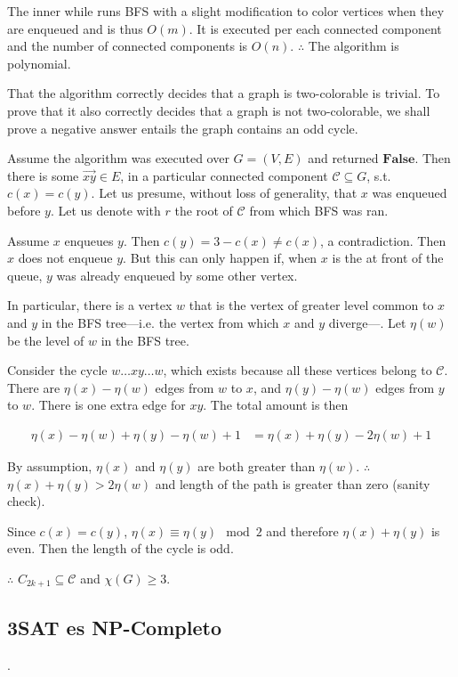 \documentclass[a4paper]{article}
\begin{document}
The inner while runs BFS with a slight modification to color vertices when they
are enqueued and is thus $O(m)$. It is executed per each connected component
and the number of connected components is $O(n)$. $\therefore $ The algorithm 
is polynomial. 

That the algorithm correctly decides that a graph is two-colorable is trivial.
To prove that it also correctly decides that a graph is not two-colorable, we
shall prove a negative answer entails the graph contains an odd cycle.

Assume the algorithm was executed over $G = (V, E)$ and returned
$\textbf{False}$. Then there is some $\overrightarrow{xy} \in E$, in a
particular connected component $\mathcal{C} \subseteq G$, s.t.
$c(x) = c(y)$. Let us presume, without loss of generality, that 
$x$ was enqueued before $y$. Let us denote with $r$ the root 
of $\mathcal{C}$ from which BFS was ran.

Assume $x$ enqueues $y$. Then $c(y) = 3 - c(x) \neq c(x)$, a contradiction.
Then $x$ does not enqueue $y$. But this can only happen if, when $x$ is the at
front of the queue, $y$ was already enqueued by some other vertex. 

In particular, there is a vertex $w$ that is the vertex of greater level common
to $x$ and $y$ in the BFS tree---i.e. the vertex from which $x$ and $y$
diverge---. Let $\eta(w)$ be the level of $w$ in the BFS
tree.

Consider the cycle $w \ldots x y \ldots w$, which exists because all these
vertices belong to $\mathcal{C}$. There are $\eta(x) - \eta(w)$ edges from $w$ to
$x$, and $\eta(y) - \eta(w)$ edges from $y$ to $w$. There is one 
extra edge for $xy$. The total amount is then 

\begin{align*}
    \eta(x) - \eta(w) + \eta(y) - \eta(w) + 1 &= \eta(x) + \eta(y) - 2\eta(w) + 1
\end{align*}

By assumption, $\eta(x)$ and $\eta(y)$ are both greater than $\eta(w)$.
$\therefore $ $\eta(x) + \eta(y) > 2\eta(w)$ and length of the path is greater
than zero (sanity check). 

Since $c(x) = c(y)$, $\eta(x) \equiv \eta(y) \mod 2$ and therefore $\eta(x) +
\eta(y)$ is even. Then the length of the cycle is odd. 

$\therefore $ $C_{2k+1} \subseteq \mathcal{C}$ and $\chi(G) \geq 3$.


\pagebreak

\subsection{3SAT es NP-Completo}.
\end{document}
